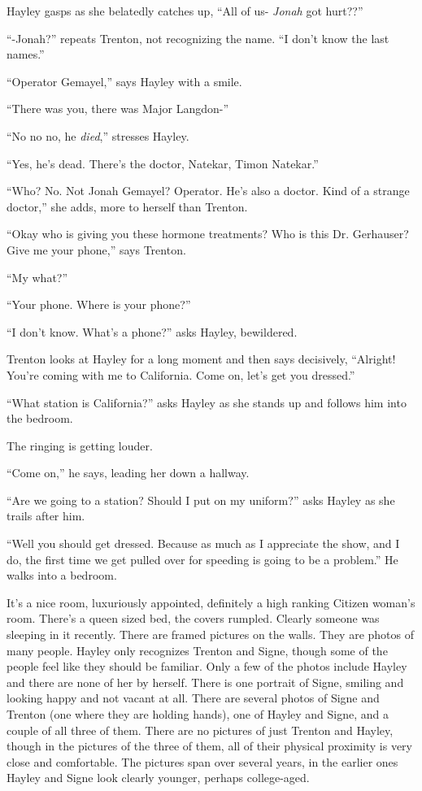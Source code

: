 Hayley gasps as she belatedly catches up, ``All of us- \textit{Jonah} got hurt??''

``-Jonah?'' repeats Trenton, not recognizing the name.  ``I don't know the last names.''

``Operator Gemayel,'' says Hayley with a smile.

``There was you, there was Major Langdon-''

``No no no, he \textit{died},'' stresses Hayley.

``Yes, he's dead.  There's the doctor, Natekar,  Timon Natekar.''

``Who?  No.  Not Jonah Gemayel?  Operator.  He's also a doctor. Kind of a strange doctor,'' she adds, more to herself than Trenton.

``Okay who is giving you these hormone treatments?  Who is this Dr. Gerhauser? Give me your phone,'' says Trenton.

``My what?''

``Your phone. Where is your phone?''

``I don't know.  What's a phone?'' asks Hayley, bewildered.



Trenton looks at Hayley for a long moment and then says decisively, ``Alright!  You're coming with me to California. Come on, let's get you dressed.''

``What station is California?'' asks Hayley as she stands up and follows him into the bedroom.

The ringing is getting louder.

``Come on,'' he says, leading her down a hallway.

``Are we going to a station?  Should I put on my uniform?'' asks Hayley as she trails after him.

``Well you should get dressed.  Because as much as I appreciate the show, and I do, the first time we get pulled over for speeding is going to be a problem.''  He walks into a bedroom.  



It's a nice room, luxuriously appointed, definitely a high ranking Citizen woman's room.  There's a queen sized bed, the covers rumpled.  Clearly someone was sleeping in it recently.  There are framed pictures on the walls.  They are photos of many people.  Hayley only recognizes Trenton and Signe, though some of the people feel like they should be familiar.  Only a few of the photos include Hayley and there are none of her by herself.  There is one portrait of Signe, smiling and looking happy and not vacant at all. There are several photos of Signe and Trenton (one where they are holding hands), one of Hayley and Signe, and a couple of all three of them.  There are no pictures of just Trenton and Hayley, though in the pictures of the three of them, all of their physical proximity is very close and comfortable.  The pictures span over several years, in the earlier ones Hayley and Signe look clearly younger, perhaps college-aged.



